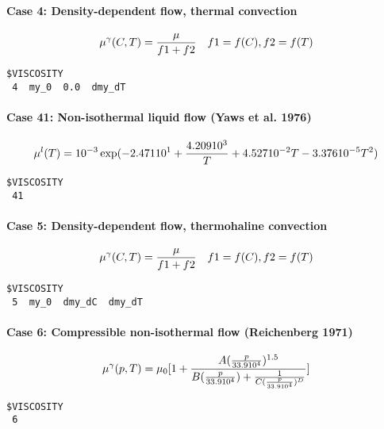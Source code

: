 \paragraph*{Case 4: Density-dependent flow, thermal convection}
\begin{eqnarray}
\mu^\gamma(C,T)
=
\frac{\mu}{f1 + f2}
\quad
f1= f(C), f2=f(T)
\end{eqnarray}
\begin{verbatim}
$VISCOSITY
 4  my_0  0.0  dmy_dT
\end{verbatim}

\paragraph*{Case 41: Non-isothermal liquid flow (Yaws et al. 1976)}
\begin{eqnarray}
\mu^l(T)
=
10^{-3} \exp(-2.471 10^1+\frac{4.209 10^3}{T}
+
4.527 10^{-2}T-3.376 10^{-5}T^2)
\end{eqnarray}
\begin{verbatim}
$VISCOSITY
 41
\end{verbatim}

\paragraph*{Case 5: Density-dependent flow, thermohaline convection}
\begin{eqnarray}
\mu^\gamma(C,T)
=
\frac{\mu}{f1 + f2}
\quad
f1= f(C), f2=f(T)
\end{eqnarray}
\begin{verbatim}
$VISCOSITY
 5  my_0  dmy_dC  dmy_dT
\end{verbatim}

\paragraph*{Case 6: Compressible non-isothermal flow (Reichenberg 1971)}
\begin{eqnarray}
\mu^\gamma(p,T)
=
\mu_0 [1+ \frac{A(\frac{p}{33.9
10^4})^{1.5}}{B(\frac{p}{33.9 10^4}) +
\frac{1}{C(\frac{p}{33.9 10^4})^D}}]
\end{eqnarray}
\begin{verbatim}
$VISCOSITY
 6
\end{verbatim}

